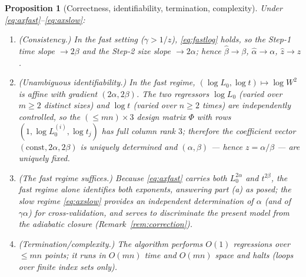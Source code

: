 \documentclass{amsart}
\newtheorem{proposition}{Proposition}
\theoremstyle{definition}
\begin{document}
\begin{proposition}[Correctness, identifiability, termination, complexity]\label{prop:alg}
Under \eqref{eq:axfast}--\eqref{eq:axslow}:
\begin{enumerate}
\item[\textnormal{(i)}] \emph{(Consistency.)} In the fast setting
  ($\gamma>1/z$), \eqref{eq:fastlog} holds, so the Step-1 time slope $\to2\beta$ and
  the Step-2 size slope $\to2\alpha$; hence $\hat\beta\to\beta$,
  $\hat\alpha\to\alpha$, $\hat z\to z$.
\item[\textnormal{(ii)}] \emph{(Unambiguous identifiability.)} In the fast regime,
  $(\log L_0,\log t)\mapsto\log W^2$ is affine with gradient $(2\alpha,2\beta)$. The
  two regressors $\log L_0$ (varied over $m\ge2$ distinct sizes) and $\log t$
  (varied over $n\ge2$ times) are independently controlled, so the $(\le mn)\times3$
  design matrix $\Phi$ with rows $(1,\log L_0^{(i)},\log t_j)$ has full column rank
  $3$; therefore the coefficient vector $(\text{const},2\alpha,2\beta)$ is uniquely
  determined and $(\alpha,\beta)$ — hence $z=\alpha/\beta$ — are uniquely fixed.
\item[\textnormal{(iii)}] \emph{(The fast regime suffices.)} Because
  \eqref{eq:axfast} carries both $L_0^{2\alpha}$ and $t^{2\beta}$, the fast regime
  alone identifies both exponents, answering part (a) as posed; the slow regime
  \eqref{eq:axslow} provides an independent determination of $\alpha$ (and of
  $\gamma\alpha$) for cross-validation, and serves to discriminate the present model
  from the adiabatic closure (Remark~\ref{rem:correction}).
\item[\textnormal{(iv)}] \emph{(Termination/complexity.)} The algorithm performs
  $O(1)$ regressions over $\le mn$ points; it runs in $O(mn)$ time and $O(mn)$
  space and halts (loops over finite index sets only).
\end{enumerate}
\end{proposition}
\end{document}
